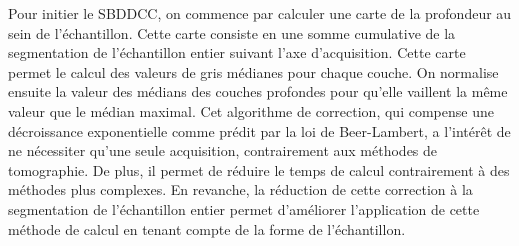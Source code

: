 \documentclass[\main/main.tex]{subfiles}
\begin{document}
%
Pour initier le SBDDCC,
on commence par calculer une carte de la profondeur au sein de l'échantillon.
%
Cette carte consiste en une somme cumulative de la segmentation de l'échantillon entier
suivant l'axe d'acquisition.
%
Cette carte permet le calcul des valeurs de gris médianes pour chaque couche.
%
On normalise ensuite la valeur des médians des couches profondes pour qu'elle vaillent la même valeur que le médian maximal.
%
Cet algorithme de correction,
qui compense une décroissance exponentielle comme prédit par la loi de Beer-Lambert,
a l'intérêt de ne nécessiter qu'une seule acquisition, contrairement aux méthodes de tomographie.
%
De plus, il permet de réduire le temps de calcul contrairement à des méthodes plus complexes.
%
En revanche, la réduction de cette correction à la segmentation de l'échantillon entier permet
d'améliorer l'application de cette méthode de calcul en tenant compte de la forme de
l'échantillon.
\end{document}
